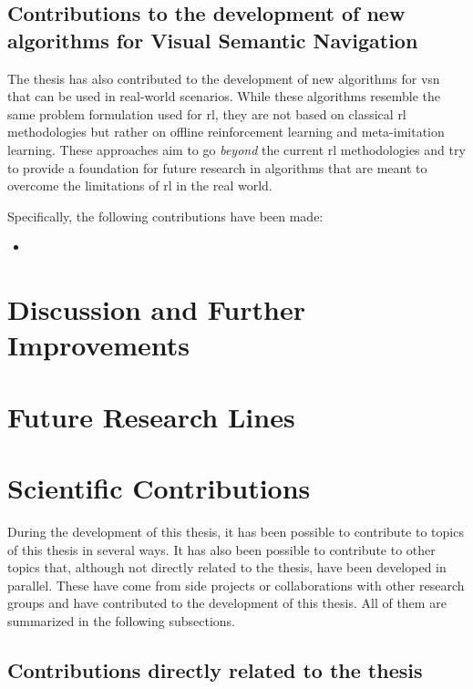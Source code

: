 \subsection{Contributions to the development of new algorithms for Visual Semantic Navigation}\label{subsec:contributions-to-new-algorithms-for-visual-semantic-navigation}

The thesis has also contributed to the development of new algorithms for \acrshort{vsn} that can be used in real-world scenarios.
While these algorithms resemble the same problem formulation used for \acrshort{rl}, they are not based on classical \acrshort{rl} methodologies but rather on offline reinforcement learning and meta-imitation learning.
These approaches aim to go \textit{beyond} the current \acrshort{rl} methodologies and try to provide a foundation for future research in algorithms that are meant to overcome the limitations of \acrshort{rl} in the real world.

Specifically, the following contributions have been made:

\begin{itemize}
    \item
\end{itemize}

\section{Discussion and Further Improvements}\label{sec:discussion-and-further-improvements}

\section{Future Research Lines}\label{sec:future-work}

\section{Scientific Contributions}\label{sec:final-remarks}

During the development of this thesis, it has been possible to contribute to topics of this thesis in several ways.
It has also been possible to contribute to other topics that, although not directly related to the thesis, have been developed in parallel.
These have come from side projects or collaborations with other research groups and have contributed to the development of this thesis.
All of them are summarized in the following subsections.

\subsection{Contributions directly related to the thesis}\label{subsec:contributions-directly-related-to-the-thesis}

